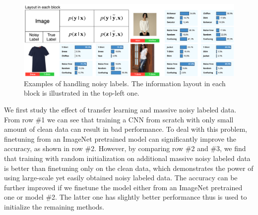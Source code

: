\documentclass[10pt,twocolumn,letterpaper]{article}
\begin{document}

\begin{figure}
\begin{center}
\end{center}
\includegraphics[width=1.0\linewidth]{figure/model_output.pdf}
\caption{Examples of handling noisy labels. The information layout in each block is illustrated in the top-left one.}
\label{fig:model_output}
\end{figure}

We first study the effect of transfer learning and massive noisy labeled data. From row \#1 we can see that training a CNN from scratch with only small amount of clean data can result in bad performance. To deal with this problem, finetuning from an ImageNet pretrained model can significantly improve the accuracy, as shown in row \#2. However, by comparing row \#2 and \#3, we find that training with random initialization on additional massive noisy labeled data is better than finetuning only on the clean data, which demonstrates the power of using large-scale yet easily obtained noisy labeled data. The accuracy can be further improved if we finetune the model either from an ImageNet pretrained one or model \#2. The latter one has slightly better performance thus is used to initialize the remaining methods.
\end{document}
